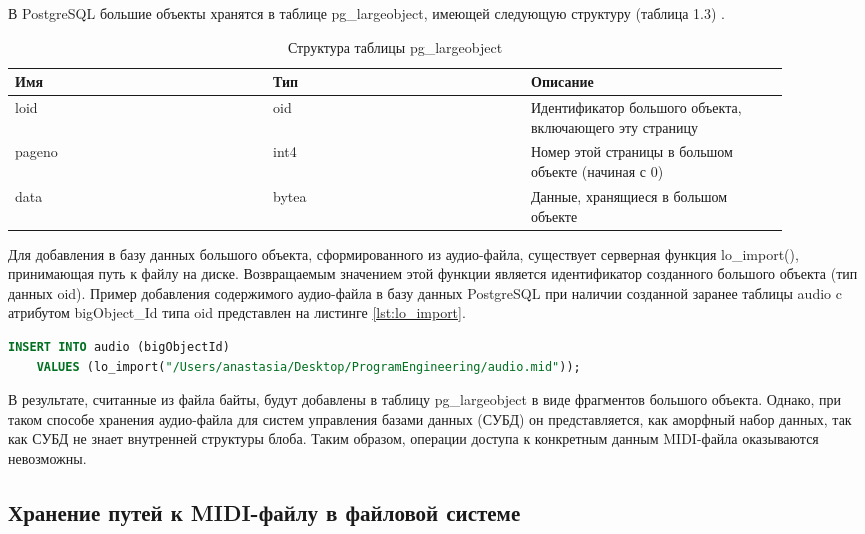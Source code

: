 В PostgreSQL большие объекты хранятся в таблице pg\_largeobject, имеющей следующую структуру (таблица 1.3) \cite{PSQL}.

\begin{table}[H]
\caption{Структура таблицы pg\_largeobject}
\begin{center}
\begin{tabular}{|p{0.3\linewidth}|p{0.3\linewidth}|p{0.3\linewidth}|}
		\hline
		Имя & Тип & Описание \\ [0.5ex] 
 		\hline
		loid & oid & Идентификатор большого объекта, включающего эту страницу\\
		\hline
		pageno & int4 & Номер этой страницы в большом объекте (начиная с 0)\\
		\hline
		data & bytea & Данные, хранящиеся в большом объекте\\
		\hline
\end{tabular}
\end{center}
\end{table}

Для добавления в базу данных большого объекта, сформированного из аудио-файла, существует серверная функция lo\_import(), принимающая путь к файлу на диске. Возвращаемым значением этой функции является идентификатор созданного большого объекта (тип данных oid). Пример добавления содержимого аудио-файла в базу данных PostgreSQL при наличии созданной заранее таблицы audio c атрибутом bigObject\_Id типа oid представлен на листинге \ref{lst:lo_import}.

\newpage

\begin{lstlisting}[language=sql, label=some-code, caption=Пример добавления аудио-файла в базу данных PostgreSQL в виде блоба, label=lst:lo_import]
INSERT INTO audio (bigObjectId)
    VALUES (lo_import("/Users/anastasia/Desktop/ProgramEngineering/audio.mid"));
\end{lstlisting}

В результате, считанные из файла байты, будут добавлены в таблицу pg\_largeobject в виде фрагментов большого объекта. Однако, при таком способе хранения аудио-файла для систем управления базами данных (СУБД) он представляется, как аморфный набор данных, так как СУБД не знает внутренней структуры блоба. Таким образом, операции доступа к конкретным данным MIDI-файла оказываются невозможны.

\subsection{Хранение путей к MIDI-файлу в файловой системе}

